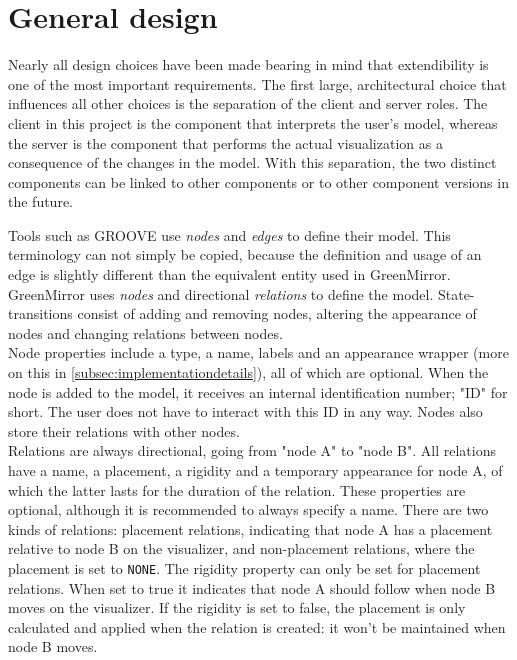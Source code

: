 \documentclass[a4paper]{article}
\begin{document}
\section{General design}\label{sec:generaldesign}
Nearly all design choices have been made bearing in mind that extendibility is one of the most important requirements. The first large, architectural choice that influences all other choices is the separation of the client and server roles. The client in this project is the component that interprets the user's model, whereas the server is the component that performs the actual visualization as a consequence of the changes in the model. With this separation, the two distinct components can be linked to other components or to other component versions in the future.

Tools such as GROOVE use \emph{nodes} and \emph{edges} to define their model. This terminology can not simply be copied, because the definition and usage of an edge is slightly different than the equivalent entity used in GreenMirror. GreenMirror uses \emph{nodes} and directional \emph{relations} to define the model. State-transitions consist of adding and removing nodes, altering the appearance of nodes and changing relations between nodes. \\
Node properties include a type, a name, labels and an appearance wrapper (more on this in \cref{subsec:implementationdetails}), all of which are optional. When the node is added to the model, it receives an internal identification number; "ID" for short. The user does not have to interact with this ID in any way. Nodes also store their relations with other nodes. \\
Relations are always directional, going from "node A" to "node B". All relations have a name, a placement, a rigidity and a temporary appearance for node A, of which the latter lasts for the duration of the relation. These properties are optional, although it is recommended to always specify a name. There are two kinds of relations: placement relations, indicating that node A has a placement relative to node B on the visualizer, and non-placement relations, where the placement is set to \lstinline{NONE}. The rigidity property can only be set for placement relations. When set to true it indicates that node A should follow when node B moves on the visualizer. If the rigidity is set to false, the placement is only calculated and applied when the relation is created: it won't be maintained when node B moves.
\end{document}
